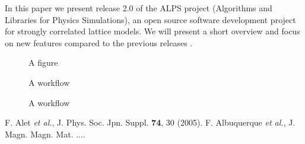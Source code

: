 \documentclass[12pt]{iopart}
\begin{document}
In this paper we present release 2.0 of the ALPS project  (Algorithms and Libraries for Physics Simulations), an open source software development project for strongly correlated lattice models. We will present a short overview  and focus on new features compared to the previous releases \cite{ALPS1.2,ALPS1.3}.

\begin{figure}
\begin{center}
\caption{A figure}
\label{green}
\end{center}
\end{figure}


\begin{figure}
\begin{center}
\caption{A workflow}
\label{workflow}
\end{center}
\end{figure}



\begin{figure}
\begin{center}
\caption{A workflow}
\label{tree}
\end{center}
\end{figure}




\begin{thebibliography}{99} 
 F. Alet {\it et al.},  J. Phys. Soc. Jpn. Suppl. {\bf 74}, 30 (2005).
 F. Albuquerque {\it et al.}, J. Magn. Magn. Mat. ....


\end{thebibliography}
\end{document}
